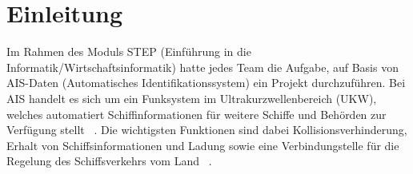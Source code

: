 \section*{Einleitung}
Im Rahmen des Moduls STEP (Einführung in die Informatik/Wirtschaftsinformatik) hatte jedes Team die Aufgabe, auf Basis von AIS-Daten (Automatisches Identifikationssystem) ein Projekt durchzuführen. Bei AIS handelt es sich um ein Funksystem im Ultrakurzwellenbereich (UKW), welches automatiert Schiffinformationen für weitere Schiffe und Behörden zur Verfügung stellt ~\autocite[vgl.][S.32]{fischer2016}. Die wichtigsten Funktionen sind dabei Kollisionsverhinderung, Erhalt von Schiffsinformationen und Ladung sowie eine Verbindungstelle für die Regelung des Schiffsverkehrs vom Land ~\autocite[vgl.][S.32]{fischer2016}. 
